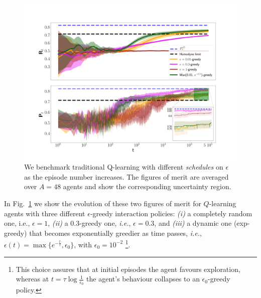 \begin{figure}[t!]
    \centering
    \includegraphics[width=1.\textwidth]{Figures/315/rev_QL.png}
    \caption{We benchmark traditional Q-learning with different \textit{schedules} on $\epsilon$ as the episode number increases. The figures of merit are averaged over $A=48$ agents and show the corresponding uncertainty region. }
    \label{fig:compEpsql}
\end{figure}

In Fig.~\ref{fig:compEpsql} we show the evolution of these two figures of merit for $Q$-learning agents with three different $\epsilon$-greedy interaction policies: \textit{(i)} a completely random one, i.e., $\epsilon=1$, \textit{(ii)} a $0.3$-greedy one, \textit{i.e.}, $\epsilon=0.3$, and \textit{(iii)} a dynamic one (exp-greedy) that becomes exponentially greedier as time passes, \textit{i.e.}, $\epsilon (t)=\max\{e^{- \frac{t}{\tau}},\epsilon_0\}$, with $\epsilon_0=10^{-2}$
\footnote{
This choice assures that at initial episodes the agent favours exploration, whereas at $t = \tau \log \frac{1}{\epsilon_0}$ the agent's behaviour collapses to an $\epsilon_0$-greedy policy.}.

